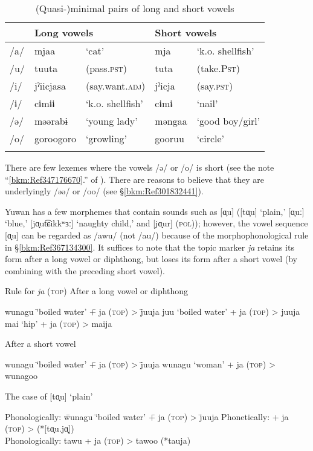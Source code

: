 \begin{table}
\caption{(Quasi-)minimal pairs of long and short vowels}
\begin{tabular}{ *{5}{l} } 
\lsptoprule
 & \multicolumn{2}{l}{Long vowels} & \multicolumn{2}{l}{Short vowels}\\
 \midrule
{/a/} & {mjaa} & {‘cat’} & {mja} & {‘k.o. shellfish’}\\
{/u/} & {tuuta} & {(pass.\textsc{pst})} & {tuta} & {(take.P\textsc{st})}\\
{/i/} & {jˀiicjasa} & {(say.want.\textsc{adj})} & {jˀicja} & {(say.\textsc{pst})}\\
{/ɨ/} & {cɨmɨɨ} & {‘k.o. shellfish’} & cɨmɨ & {‘nail’}\\
{/ə/} & {məərabɨ} & {‘young lady’} & {məngaa} & {‘good boy/girl’}\\
{/o/} & {goroogoro} & {‘growling’} & {gooruu} & {‘circle’}\\
\lspbottomrule
\end{tabular}
\end{table}

There are few lexemes where the vowels /ə/ or /o/ is short (see the note “\ref{bkm:Ref347176670}.” of ). There are reasons to believe that they are underlyingly /əə/ or /oo/ (see §\ref{bkm:Ref301832441}).

Yuwan has a few morphemes that contain sounds such as [ɑ̟u] ([tɑ̟u] ‘plain,’ [ɑ̟uː] ‘blue,’ [jɑ̟ut͡ɕikkʷɜː] ‘naughty child,’ and [jɑ̟ur] (\textsc{pol})); however, the vowel sequence [ɑ̟u] can be regarded as /awu/ (not /au/) because of the morphophonological rule in §\ref{bkm:Ref367134300}. It suffices to note that the topic marker \textit{ja} retains its form after a long vowel or diphthong, but loses its form after a short vowel (by combining with the preceding short vowel).

\ea Rule for \textit{ja} (\textsc{top})
\ea After a long vowel or diphthong\\
\begin{tabbing}
    wunagu  \= ‘boiled water’ \=  +   ja   (\textsc{top})   > \=  juuja\kill
    juu  \> ‘boiled water’ \>  +   ja   (\textsc{top})   > \>  juuja\\
    mai  \> ‘hip’          \>  +   ja   (\textsc{top})   > \>  maija
\end{tabbing}
\ex After a short vowel\\
\begin{tabbing}
    wunagu  \= ‘boiled water’ \=  +   ja   (\textsc{top})   > \=  juuja\kill
    wunagu \>  ‘woman’  \> +  ja (\textsc{top})  >  \> wunagoo
\end{tabbing}
\z
\ex The case of [tɑ̟u] ‘plain’\\
\begin{tabbing}
    Phonologically: \= wunagu  \= ‘boiled water’ \=  +   ja   (\textsc{top})   > \=  juuja\kill
    Phonetically:  \> [tɑ̟u] \>  +   ja (\textsc{top})   >  \> [tɑ̟.ʷo̞ː]   (*[tɑ̟u.jɑ̟])\\
    Phonologically: \>   tawu \>  +   ja (\textsc{top})   >  \> tawoo   (*tauja)
\end{tabbing}
\z

